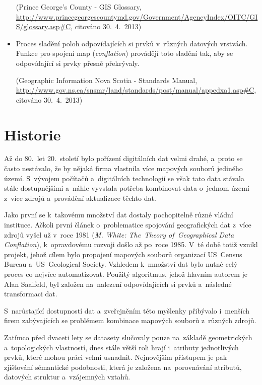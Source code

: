 \begin{itemize}
    (Prince George's County - GIS Glossary,
    \url{http://www.princegeorgescountymd.gov/Government/AgencyIndex/OITC/GIS/glossary.asp#C},
    citováno 30.~4.~2013)

  \item Proces sladění poloh odpovídajících si prvků v~různých datových 
    vrstvách. Funkce pro spojení map (\textit{conflation}) provádějí toto 
    sladění tak, aby se odpovídající si prvky přesně překrývaly. 
    
    (Geographic Information Nova Scotia - Standards Manual,
    \url{http://www.gov.ns.ca/snsmr/land/standards/post/manual/appedxa1.asp#C},
     citováno 30.~4.~2013)

\end{itemize}

\section{Historie}
\label{historie}

Až do 80.~let 20.~století bylo pořízení digitálních dat velmi drahé, a~proto 
se často nestávalo, že by nějaká firma vlastnila více mapových souborů jediného 
území. S~vývojem počítačů a~digitálních technologií se však tato data stávala 
stále do\-stupnějšími a~náhle vyvstala potřeba kombinovat data o~jednom území 
z~více zdrojů a~provádění aktualizace těchto dat. 

Jako první se k~takovému množství dat dostaly pochopitelně různé vládní 
instituce. Ačkoli první článek o~problematice spojování geografických dat 
z~více zdrojů vyšel už v~roce 1981 (\textit{M. White: The~Theory of~Geographical
Data Conflation}), k~opravdovému rozvoji došlo až po~roce 1985. V~té době 
totiž vznikl projekt, jehož cílem bylo propojení mapových souborů organizací
US~Census Bureau a~US~Geological Society. Vzhledem k~množství dat bylo nutné
celý proces co nejvíce auto\-matizovat. Použitý algoritmus, jehož hlavním autorem
je Alan Saalfeld, byl založen na~nalezení odpovídajících si prvků a~následné 
transformaci dat. 

S~narůstající dostupností dat a~zveřejněním této myšlenky přibývalo i~menších 
firem zabývajících se problémem kombinace mapových souborů z~různých zdrojů.

Zatímco před dvaceti lety se datasety slučovaly pouze na~základě geometric\-kých 
a~topologických vlastností, dnes stále větší roli hrají i~atributy jednotlivých 
prvků, které mohou práci velmi usnadnit. Nejnovějším přístupem je pak zjišťování 
sémantické podobnosti, která je založena na~porovnávání atributů, datových 
struktur a~vzájemných vztahů.


